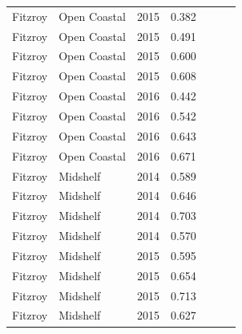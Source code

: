 \begin{longtable}{llccccc}
  Fitzroy & Open Coastal & 2015 & 0.382 & \cellcolor[HTML]{F47721}{D} & \cellcolor[HTML]{F47721}{D} & \cellcolor[HTML]{F47721}{D} \\ 
  Fitzroy & Open Coastal & 2015 & 0.491 & \cellcolor[HTML]{F47721}{D} & \cellcolor[HTML]{F0C918}{C} & \cellcolor[HTML]{F47721}{D} \\ 
  Fitzroy & Open Coastal & 2015 & 0.600 & \cellcolor[HTML]{F0C918}{C} & \cellcolor[HTML]{B0D235}{B} & \cellcolor[HTML]{F0C918}{C} \\ 
  Fitzroy & Open Coastal & 2015 & 0.608 & \cellcolor[HTML]{F0C918}{C} & \cellcolor[HTML]{B0D235}{B} & \cellcolor[HTML]{F0C918}{C} \\ 
  Fitzroy & Open Coastal & 2016 & 0.442 & \cellcolor[HTML]{F47721}{D} & \cellcolor[HTML]{F0C918}{C} & \cellcolor[HTML]{F47721}{D} \\ 
  Fitzroy & Open Coastal & 2016 & 0.542 & \cellcolor[HTML]{F0C918}{C} & \cellcolor[HTML]{F0C918}{C} & \cellcolor[HTML]{F0C918}{C} \\ 
  Fitzroy & Open Coastal & 2016 & 0.643 & \cellcolor[HTML]{F0C918}{C} & \cellcolor[HTML]{B0D235}{B} & \cellcolor[HTML]{F0C918}{C} \\ 
  Fitzroy & Open Coastal & 2016 & 0.671 & \cellcolor[HTML]{B0D235}{B} & \cellcolor[HTML]{B0D235}{B} & \cellcolor[HTML]{B0D235}{B} \\ 
  Fitzroy & Midshelf & 2014 & 0.589 & \cellcolor[HTML]{F0C918}{C} & \cellcolor[HTML]{F0C918}{C} & \cellcolor[HTML]{F0C918}{C} \\ 
  Fitzroy & Midshelf & 2014 & 0.646 & \cellcolor[HTML]{F0C918}{C} & \cellcolor[HTML]{B0D235}{B} & \cellcolor[HTML]{F0C918}{C} \\ 
  Fitzroy & Midshelf & 2014 & 0.703 & \cellcolor[HTML]{B0D235}{B} & \cellcolor[HTML]{B0D235}{B} & \cellcolor[HTML]{B0D235}{B} \\ 
  Fitzroy & Midshelf & 2014 & 0.570 & \cellcolor[HTML]{F0C918}{C} & \cellcolor[HTML]{F0C918}{C} & \cellcolor[HTML]{F0C918}{C} \\ 
  Fitzroy & Midshelf & 2015 & 0.595 & \cellcolor[HTML]{F0C918}{C} & \cellcolor[HTML]{F0C918}{C} & \cellcolor[HTML]{F0C918}{C} \\ 
  Fitzroy & Midshelf & 2015 & 0.654 & \cellcolor[HTML]{F0C918}{C} & \cellcolor[HTML]{B0D235}{B} & \cellcolor[HTML]{B0D235}{B} \\ 
  Fitzroy & Midshelf & 2015 & 0.713 & \cellcolor[HTML]{B0D235}{B} & \cellcolor[HTML]{B0D235}{B} & \cellcolor[HTML]{B0D235}{B} \\ 
  Fitzroy & Midshelf & 2015 & 0.627 & \cellcolor[HTML]{F0C918}{C} & \cellcolor[HTML]{B0D235}{B} & \cellcolor[HTML]{F0C918}{C} \\ 

\end{longtable}
